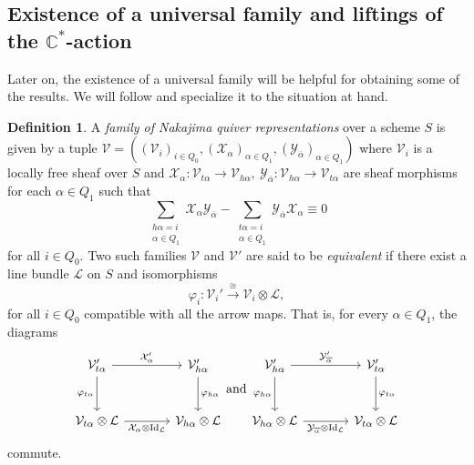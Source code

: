 \documentclass{amsart}
\theoremstyle{plain}
\numberwithin{equation}{section}
\theoremstyle{definition}
\newtheorem{definition}[theorem]{Definition}
\theoremstyle{remark}
\begin{document}
	\subsection{Existence of a universal family and liftings of the $\mathbb{C}^*$-action}\label{universalFamilyNakajimaQuiverVarietiesAndLiftingsTorusAction}
	Later on, the existence of a universal family will be helpful for obtaining some of the results. We will follow \cite[Section 5]{KingModuli} and specialize it to the situation at hand. 
	\begin{definition}
		A \emph{family of Nakajima quiver representations} over a scheme $S$ is given by a tuple $\mathcal{V}=((\mathcal{V}_i)_{i\in Q_0},(\mathcal{X}_{\alpha})_{\alpha\in Q_1},(\mathcal{Y_{\overline{\alpha}}})_{\alpha\in Q_1})$ where $\mathcal{V}_i$ is a locally free sheaf over $S$ and $\mathcal{X}_{\alpha}:\mathcal{V}_{t\alpha}\to \mathcal{V}_{h\alpha},\ \mathcal{Y}_{\overline\alpha}:\mathcal{V}_{h\alpha}\to \mathcal{V}_{t\alpha}$ are sheaf morphisms for each $\alpha\in Q_1$ such that 
		$$
		\sum_{\substack{h\alpha=i\\\alpha\in Q_1}}\mathcal{X}_\alpha\mathcal{Y}_{\overline{\alpha}}-\sum_{\substack{t\alpha=i\\\alpha\in Q_1}}\mathcal{Y}_{\overline{\alpha}}\mathcal{X}_\alpha\equiv 0
		$$
		for all $i\in Q_0$. Two such families \(\mathcal V\) and \(\mathcal V'\) are said to be
		\emph{equivalent} if there exist a line bundle \(\mathcal L\) on \(S\)
		and isomorphisms
		$$
		\varphi_i:\mathcal V_i'
		\xrightarrow{\cong}
		\mathcal V_i\otimes\mathcal L,
		$$
		for all $i\in Q_0$
		compatible with all the arrow maps. That is, for every
		$\alpha\in Q_1$, the diagrams
		$$
		\begin{tikzcd}[column sep=large,row sep=large]
			\mathcal V'_{t\alpha}
			\arrow[r,"\mathcal X'_\alpha"]
			\arrow[d,"\varphi_{t\alpha}"']
			&
			\mathcal V'_{h\alpha}
			\arrow[d,"\varphi_{h\alpha}"]
			\\
			\mathcal V_{t\alpha}\otimes\mathcal L
			\arrow[r,"\mathcal X_\alpha\otimes
			\operatorname{Id}_{\mathcal L}"']
			&
			\mathcal V_{h\alpha}\otimes\mathcal L
		\end{tikzcd}
		\text{and}
		\begin{tikzcd}[column sep=large,row sep=large]
			\mathcal V'_{h\alpha}
			\arrow[r,"\mathcal Y'_{\overline\alpha}"]
			\arrow[d,"\varphi_{h\alpha}"']
			&
			\mathcal V'_{t\alpha}
			\arrow[d,"\varphi_{t\alpha}"]
			\\
			\mathcal V_{h\alpha}\otimes\mathcal L
			\arrow[r,"\mathcal Y_{\overline\alpha}\otimes
			\operatorname{Id}_{\mathcal L}"']
			&
			\mathcal V_{t\alpha}\otimes\mathcal L
		\end{tikzcd}
		$$
		commute.
	\end{definition}
\end{document}
